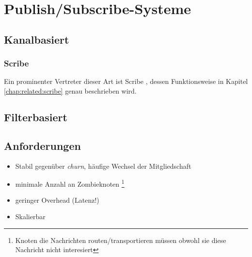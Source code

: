 \section{Publish/Subscribe-Systeme}
\label{chap:grundlagen:pubsub}

\subsection{Kanalbasiert}
\subsubsection{Scribe}
Ein prominenter Vertreter dieser Art ist Scribe \cite{citeulike:345316}, dessen Funktionsweise in Kapitel \ref{chap:related:scribe} genau beschrieben wird.

\subsection{Filterbasiert}
\cite{citeulike:854573} %
\cite{citeulike:6674153} %
\cite{citeulike:4291} %

\subsection{Anforderungen}
\begin{itemize}
\item Stabil gegenüber \emph{churn}, häufige Wechsel der Mitgliedschaft
\item minimale Anzahl an Zombieknoten \footnote{Knoten die Nachrichten routen/transportieren müssen obwohl sie diese Nachricht nicht interesiert}
\item geringer Overhead (Latenz!)
\item Skalierbar
\end{itemize}
